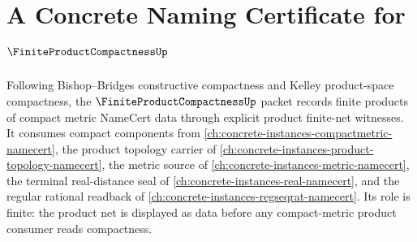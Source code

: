 \chapter{A Concrete Naming Certificate for $\FiniteProductCompactnessUp$}
\label{ch:concrete-instances-finite-product-compactness-namecert}

Following Bishop--Bridges constructive compactness and Kelley product-space compactness, the $\FiniteProductCompactnessUp$ packet records finite products of compact metric NameCert data through explicit product finite-net witnesses. It consumes compact components from \autoref{ch:concrete-instances-compactmetric-namecert}, the product topology carrier of \autoref{ch:concrete-instances-product-topology-namecert}, the metric source of \autoref{ch:concrete-instances-metric-namecert}, the terminal real-distance seal of \autoref{ch:concrete-instances-real-namecert}, and the regular rational readback of \autoref{ch:concrete-instances-regseqrat-namecert}. Its role is finite: the product net is displayed as data before any compact-metric product consumer reads compactness.

